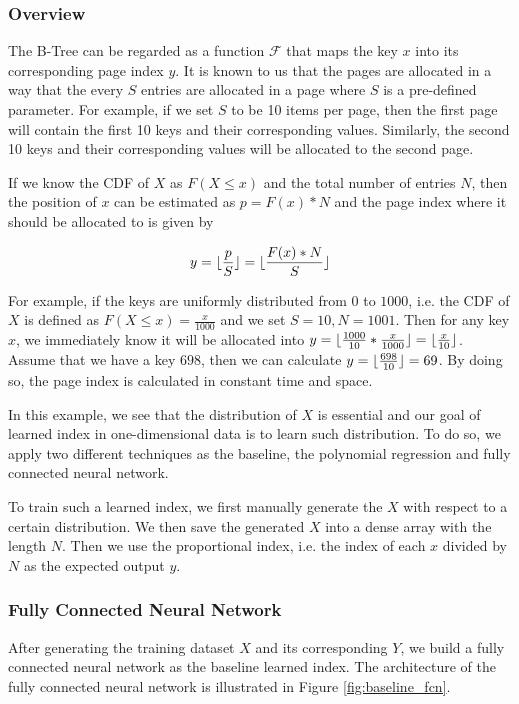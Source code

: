 \subsubsection{Overview}

The B-Tree can be regarded as a function $\mathcal{F}$ that maps the key $x$ into its corresponding page index $y$. It is known to us that the pages are allocated in a way that the every $S$ entries are allocated in a page where $S$ is a pre-defined parameter. For example, if we set $S$ to be 10 items per page, then the first page will contain the first 10 keys and their corresponding values. Similarly, the second 10 keys and their corresponding values will be allocated to the second page.

If we know the CDF of $X$ as $F(X\leq x)$ and the total number of entries $N$, then the position of $x$ can be estimated as $p=F(x)*N$ and the page index where it should be allocated to is given by

$$y=\lfloor\frac{p}{S}\rfloor=\lfloor\frac{F(x)*N}{S}\rfloor$$  

For example, if the keys are uniformly distributed from $0$ to $1000$, i.e. the CDF of $X$ is defined as $F(X\leq x)=\frac{x}{1000}$ and we set $S=10, N=1001$. Then for any key $x$, we immediately know it will be allocated into $y=\lfloor\frac{1000}{10}*\frac{x}{1000}\rfloor=\lfloor\frac{x}{10}\rfloor$. Assume that we have a key $698$, then we can calculate $y=\lfloor\frac{698}{10}\rfloor=69$. By doing so, the page index is calculated in constant time and space.

In this example, we see that the distribution of $X$ is essential and our goal of learned index in one-dimensional data is to learn such distribution. To do so, we apply two different techniques as the baseline, the polynomial regression and fully connected neural network.

To train such a learned index, we first manually generate the $X$ with respect to a certain distribution. We then save the generated $X$ into a dense array with the length $N$. Then we use the proportional index, i.e. the index of each $x$ divided by $N$ as the expected output $y$.
 
\subsubsection{Fully Connected Neural Network}

After generating the training dataset $X$ and its corresponding $Y$, we build a fully connected neural network as the baseline learned index. The architecture of the fully connected neural network is illustrated in Figure \ref{fig:baseline_fcn}.

